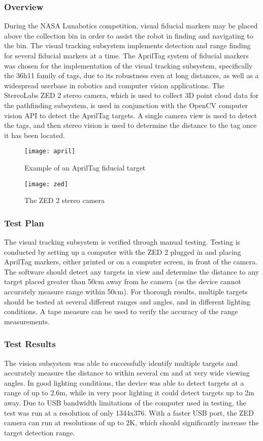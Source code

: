 \subsubsection{Overview}
During the NASA Lunabotics competition, visual fiducial markers may be placed above the collection
bin in order to assist the robot in finding and navigating to the bin.
The visual tracking subsystem implements detection and range finding for several fiducial markers
at a time.
The AprilTag system of fiducial markers was chosen for the implementation of the visual tracking
subsystem, specifically the 36h11 family of tags, due to its robustness even at long distances, as
well as a widespread userbase in robotics and computer vision applications.
The StereoLabs ZED 2 stereo camera, which is used to collect 3D point cloud data for the pathfinding
subsystem, is used in conjunction with the OpenCV computer vision API to detect the AprilTag targets.
A single camera view is used to detect the tags, and then stereo vision is used to determine the
distance to the tag once it has been located.
\begin{figure}[htbp]
    \centering
    \texttt{[image: april]}
    \caption{
        Example of an AprilTag fiducial target
    }\label{fig:april}
\end{figure}

\begin{figure}[htbp]
    \centering
    \texttt{[image: zed]}
    \caption{
        The ZED 2 stereo camera
    }\label{fig:zed}
\end{figure}

\newpage

\subsubsection{Test Plan}
The visual tracking subsystem is verified through manual testing.
Testing is conducted by setting up a computer with the ZED 2 plugged in and placing AprilTag markers,
either printed or on a computer screen, in front of the camera.
The software should detect any targets in view and determine the distance to any target placed
greater than 50cm away from he camera (as the device cannot accurately measure range within 50cm).
For thorough results, multiple targets should be tested at several different ranges and angles,
and in different lighting conditions.
A tape measure can be used to verify the accuracy of the range measurements.

\subsubsection{Test Results}
The vision subsystem was able to successfully identify multiple targets and accurately measure the
distance to within several cm and at very wide viewing angles.
In good lighting conditions, the device was able to detect targets at a range of up to 2.6m,
while in very poor lighting it could detect targets up to 2m away.
Due to USB bandwidth limitations of the computer used in testing, the test was run at a resolution
of only 1344x376.
With a faster USB port, the ZED camera can run at resolutions of up to 2K,
which should significantly increase the target detection range.

